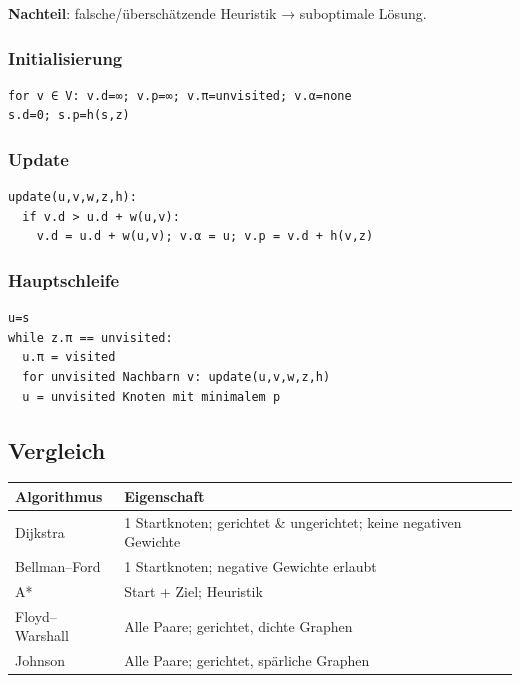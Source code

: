 \documentclass[11pt, a4paper]{article}
\begin{document}
\textbf{Nachteil}: falsche/überschätzende Heuristik → suboptimale Lösung.



\subsubsection{Initialisierung}
\begin{lstlisting}
for v ∈ V: v.d=∞; v.p=∞; v.π=unvisited; v.α=none
s.d=0; s.p=h(s,z)
\end{lstlisting}



\subsubsection{Update}
\begin{lstlisting}
update(u,v,w,z,h):
  if v.d > u.d + w(u,v):
    v.d = u.d + w(u,v); v.α = u; v.p = v.d + h(v,z)
\end{lstlisting}



\subsubsection{Hauptschleife}
\begin{lstlisting}
u=s
while z.π == unvisited:
  u.π = visited
  for unvisited Nachbarn v: update(u,v,w,z,h)
  u = unvisited Knoten mit minimalem p
\end{lstlisting}



\subsection{Vergleich}


{\small
\begin{tabularx}{\linewidth}{XX}
\hline
\rowcolor{tableheadbg}
{\color{white}\textbf{Algorithmus}} & {\color{white}\textbf{Eigenschaft}} \\[2pt]
\hline
\endhead
\hline
\endfoot
Dijkstra & 1 Startknoten; gerichtet \& ungerichtet; keine negativen Gewichte \\
Bellman–Ford & 1 Startknoten; negative Gewichte erlaubt \\
A* & Start + Ziel; Heuristik \\
Floyd–Warshall & Alle Paare; gerichtet, dichte Graphen \\
Johnson & Alle Paare; gerichtet, spärliche Graphen \\
\end{tabularx}
}
\end{document}
